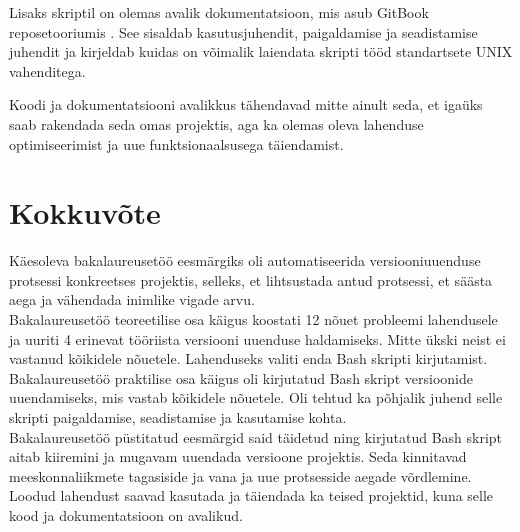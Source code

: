 \documentclass[12pt]{report}
\begin{document}
  Lisaks skriptil on olemas avalik dokumentatsioon, mis asub GitBook reposetooriumis \footnotemark. See sisaldab kasutusjuhendit, paigaldamise ja seadistamise juhendit ja kirjeldab kuidas on võimalik laiendata skripti tööd standartsete UNIX vahenditega.\\
  
  
  Koodi ja dokumentatsiooni avalikkus tähendavad mitte ainult seda, et igaüks saab rakendada seda omas projektis, aga ka olemas oleva lahenduse optimiseerimist ja uue funktsionaalsusega täiendamist.
  
  \newpage
  
  \section*{Kokkuvõte}
  \label{kokkuvote}
  
  Käesoleva bakalaureusetöö eesmärgiks oli automatiseerida versiooniuuenduse protsessi konkreetses projektis, selleks, et lihtsustada antud protsessi, et säästa aega ja vähendada inimlike vigade arvu.\\
  
  Bakalaureusetöö teoreetilise osa käigus koostati 12 nõuet probleemi lahendusele ja uuriti 4 erinevat tööriista versiooni uuenduse haldamiseks. Mitte ükski neist ei vastanud kõikidele nõuetele. Lahenduseks valiti enda Bash skripti kirjutamist.\\
  
  Bakalaureusetöö praktilise osa käigus oli kirjutatud Bash skript versioonide uuendamiseks, mis vastab kõikidele nõuetele. Oli tehtud ka põhjalik juhend selle skripti paigaldamise, seadistamise ja kasutamise kohta.\\
  
  Bakalaureusetöö püstitatud eesmärgid said täidetud ning kirjutatud Bash skript aitab kiiremini ja mugavam uuendada versioone projektis. Seda kinnitavad meeskonnaliikmete tagasiside ja vana ja uue protsesside aegade võrdlemine.\\
  
  Loodud lahendust saavad kasutada ja täiendada ka teised projektid, kuna selle kood ja dokumentatsioon on avalikud.

  \newpage
  
\end{document}
